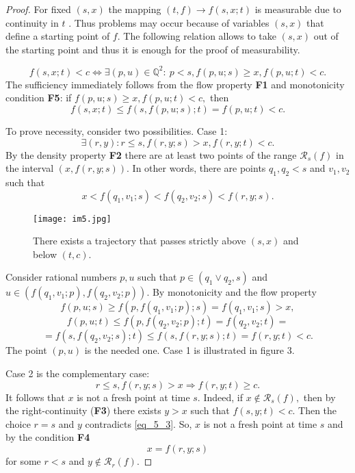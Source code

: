 \documentclass[a4paper,12pt]{article}
\newcommand{\1}{1\!\!\,{\rm I}}
\theoremstyle{plain}
\begin{document}
\begin{proof} For fixed $(s,x)$ the mapping $(t,f)\to f(s,x;t)$ is measurable due to continuity in $t$ \cite[Ch. II, L. (73.10)]{RW}. Thus problems may occur because of variables $(s,x)$ that define a starting point of $f.$ The following relation allows to take $(s,x)$ out of the starting point and thus it is enough for the proof of measurability.
	
	\begin{equation}
	\label{eq_5_4}
	f(s,x;t)<c \Leftrightarrow \exists (p,u)\in\mathbb{Q}^2: \ p<s, f(p,u;s)\geq x, f(p,u;t)<c.
	\end{equation}
	The sufficiency immediately follows from the flow property {\bf F1} and monotonicity condition {\bf F5}: if $f(p,u;s)\geq x, f(p,u;t)<c,$ then
	$$
	f(s,x;t)\leq f(s,f(p,u;s);t)=f(p,u;t)<c.
	$$
	
	To prove necessity, consider two possibilities. Case 1:
	$$
	\exists (r,y): r\leq s, f(r,y;s)>x, f(r,y;t)<c.
	$$
	By the density property {\bf F2} there are at least two points of the range $\mathcal{R}_s(f)$ in the interval $(x,f(r,y;s)).$ In other words, there are points $q_1,q_2<s$ and $v_1,v_2$ such that
	$$
	x<f(q_1,v_1;s)<f(q_2,v_2;s)<f(r,y;s).
	$$
	
		\begin{figure}[!h]
			\centering
			\caption{There exists a trajectory that passes strictly above $(s,x)$ and below $(t,c)$.}
			\texttt{[image: im5.jpg]}
		\end{figure}
		
		
	Consider rational numbers $p,u$ such that  $p\in (q_1\vee q_2,s)$ and $u \in (f(q_1,v_1;p),f(q_2,v_2;p)).$ By monotonicity and the flow property
	$$
	f(p,u;s)\geq f(p,f(q_1,v_1;p);s)=f(q_1,v_1;s)>x,
	$$
	$$
	f(p,u;t)\leq f(p,f(q_2,v_2;p);t)=f(q_2,v_2;t)=
	$$
	$$
	=f(s,f(q_2,v_2;s);t)\leq f(s,f(r,y;s);t)=f(r,y;t)<c.
	$$
	The point $(p,u)$ is the needed one. Case 1 is illustrated in figure 3.
	

	Case 2 is the complementary case:
	\begin{equation}
	\label{eq_5_3}
	r\leq s, f(r,y;s)>x \Rightarrow f(r,y;t)\geq c.
	\end{equation}
	It follows that $x$ is not a fresh point at time $s$. Indeed, if $x\not\in\mathcal{R}_s(f),$ then by the right-continuity ({\bf F3}) there exists $y>x$ such that $f(s,y;t)<c.$ Then the choice $r=s$ and $y$ contradicts \eqref{eq_5_3}. So, $x$ is not a fresh point at time $s$ and by the condition {\bf F4}
	$$
	x=f(r,y;s)
	$$
	for some $r<s$ and $y\not\in \mathcal{R}_r(f).$ 
	

\end{proof}
\end{document}
